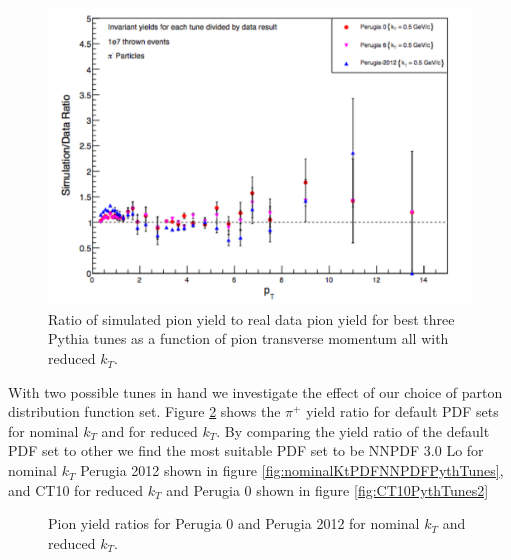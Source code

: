 \documentclass[letterpaper, abstract = on,listof=totoc, bibliography=totoc]{scrreprt}
\begin{document}
\begin{appendices}
\begin{figure}
\begin{center}
\includegraphics[width = .75\textwidth]{multLowKt}
\caption[]{Ratio of simulated pion yield to real data pion yield for best three Pythia tunes as a function of pion transverse momentum all with reduced $k_T$.}
\label{fig:multLowKt}
\end{center}
\end{figure}

With two possible tunes in hand we investigate the effect of our choice of parton distribution function set. Figure \ref{fig:nominalPDFpythTunesBoth} shows the $\pi^+$ yield ratio for default PDF sets for nominal $k_T$ and for reduced $k_T$. By comparing the yield ratio of the default PDF set to other we find the most suitable PDF set to be NNPDF 3.0 Lo for nominal $k_T$ Perugia 2012 shown in figure \ref{fig:nominalKtPDFNNPDFPythTunes}, and CT10 for reduced $k_T$ and Perugia 0 shown in figure \ref{fig:CT10PythTunes2} 


\begin{figure}
\caption{Pion yield ratios for Perugia 0 and Perugia 2012 for nominal $k_T$ and reduced $k_T$.}
\label{fig:nominalPDFpythTunesBoth}
\end{figure}





\end{appendices}
\end{document}
